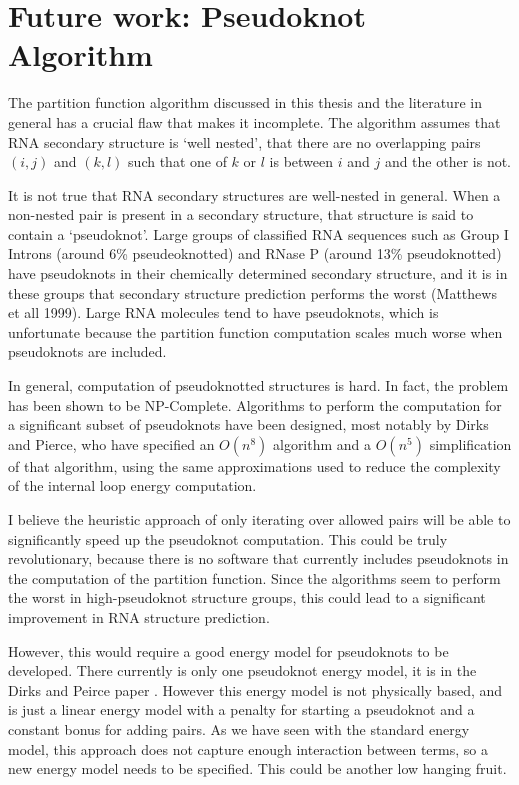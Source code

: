 \section{Future work: Pseudoknot Algorithm}

The partition function algorithm discussed in this thesis and the
literature in general has a crucial flaw that makes it incomplete. The
algorithm assumes that RNA secondary structure is `well nested', that
there are no overlapping pairs $(i, j)$ and $(k, l)$ such that one of
$k$ or $l$ is between $i$ and $j$ and the other is not.

It is not true that RNA secondary structures are well-nested in
general. When a non-nested pair is present in a secondary structure,
that structure is said to contain a `pseudoknot'. Large groups of
classified RNA sequences such as Group I Introns (around 6\%
pseudeoknotted) and RNase P (around 13\% pseudoknotted) have
pseudoknots in their chemically determined secondary structure, and it
is in these groups that secondary structure prediction performs the
worst (Matthews et all 1999). Large RNA molecules tend to have
pseudoknots, which is unfortunate because the partition function
computation scales much worse when pseudoknots are included.

In general, computation of pseudoknotted structures is hard. In fact,
the problem has been shown to be NP-Complete. Algorithms
to perform the computation for a significant subset of pseudoknots
have been designed, most notably by Dirks and Pierce, who have
specified an $O(n^8)$ algorithm and a $O(n^5)$ simplification of that
algorithm, using the same approximations used to reduce the complexity
of the internal loop energy computation.

I believe the heuristic approach of only iterating over allowed pairs
will be able to significantly speed up the pseudoknot
computation. This could be truly revolutionary, because there is no
software that currently includes pseudoknots in the computation of
the partition function. Since the algorithms seem to perform the worst
in high-pseudoknot structure groups, this could lead to a significant
improvement in RNA structure prediction. 

However, this would require a good energy model for pseudoknots to be
developed. There currently is only one pseudoknot energy model, it is
in the Dirks and Peirce paper \cite{dirks2003partition}. However this
energy model is not physically based, and is just a linear energy
model with a penalty for starting a pseudoknot and a constant bonus
for adding pairs. As we have seen with the standard energy model, this
approach does not capture enough interaction between terms, so a new
energy model needs to be specified. This could be another low hanging
fruit. 
